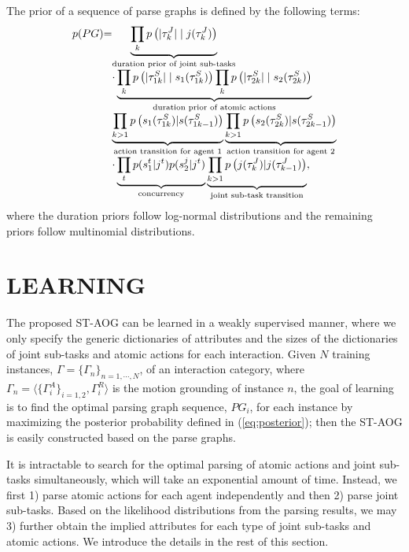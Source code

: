 \documentclass[letterpaper, 10 pt, conference]{ieeeconf}  %
\begin{document}
The prior of a sequence of parse graphs is defined by the following terms:
\begin{equation}
\setlength{\arraycolsep}{0pt}
\begin{array}{lcl}
p(PG)&=& \underbrace{\prod_k p\left(|\tau_k^J| \mid j(\tau_k^J)\right)}_{\text{duration prior of joint sub-tasks}}\\
&& \cdot \underbrace{\prod_k p\left(|\tau_{1k}^S| \mid s_1(\tau_{1k}^S)\right) \prod_k p\left(|\tau_{2k}^S| \mid s_2(\tau_{2k}^S)\right)}_{\text{duration prior of atomic actions}}\\
&& \displaystyle \underbrace{\prod_{k > 1}p\left(s_1(\tau_{1k}^S) | s(\tau_{1k-1}^S)\right)}_{\text{action transition for agent 1}}\underbrace{\prod_{k > 1}p\left(s_2(\tau_{2k}^S) | s(\tau_{2k-1}^S)\right)}_{\text{action transition for agent 2}}\\
&& \cdot  \underbrace{\prod_{t}p(s_1^t | j^t)p(s_2^j | j^t)}_{\text{concurrency}} \underbrace{\prod_{k > 1}p\left(j(\tau_k^J) | j(\tau_{k-1}^J)\right)}_{\text{joint sub-task transition}},\\
\end{array}
\label{eq:prior}
\end{equation}
where the duration priors follow log-normal distributions and the remaining priors follow multinomial distributions.


    

    

\section{LEARNING}

The proposed ST-AOG can be learned in a weakly supervised manner, where we only specify the generic dictionaries of attributes and the sizes of the dictionaries of joint sub-tasks and atomic actions for each interaction. Given $N$ training instances, $\Gamma = \{\Gamma_n\}_{n = 1,\cdots,N}$, of an interaction category, where $\Gamma_n = \langle\{\Gamma^A_i\}_{i=1,2}, \Gamma^R_i \rangle$ is the motion grounding of instance $n$, the goal of learning is to find the optimal parsing graph sequence, $PG_i$, for each instance by maximizing the posterior probability defined in (\ref{eq:posterior}); then the ST-AOG is easily constructed based on the parse graphs.

It is intractable to search for the optimal parsing of atomic actions and joint sub-tasks simultaneously, which will take an exponential amount of time. Instead, we first 1) parse atomic actions for each agent independently and then 2) parse joint sub-tasks. Based on the likelihood distributions from the parsing results, we may 3) further obtain the implied attributes for each type of joint sub-tasks and atomic actions. We introduce the details in the rest of this section.
\end{document}

